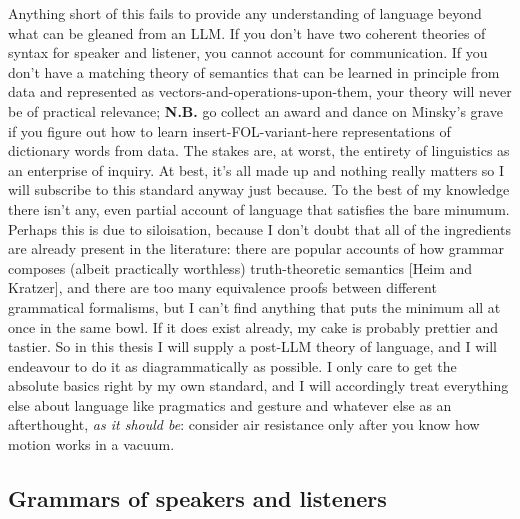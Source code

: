  Anything short of this fails to provide any understanding of language beyond what can be gleaned from an LLM. If you don't have two coherent theories of syntax for speaker and listener, you cannot account for communication. If you don't have a matching theory of semantics that can be learned in principle from data and represented as vectors-and-operations-upon-them, your theory will never be of practical relevance; \textbf{N.B.} go collect an award and dance on Minsky's grave if you figure out how to learn insert-FOL-variant-here representations of dictionary words from data. The stakes are, at worst, the entirety of linguistics as an enterprise of inquiry. At best, it's all made up and nothing really matters so I will subscribe to this standard anyway just because. To the best of my knowledge there isn't any, even partial account of language that satisfies the bare minumum. Perhaps this is due to siloisation, because I don't doubt that all of the ingredients are already present in the literature: there are popular accounts of how grammar composes (albeit practically worthless) truth-theoretic semantics [Heim and Kratzer], and there are too many equivalence proofs between different grammatical formalisms, but I can't find anything that puts the minimum all at once in the same bowl. If it does exist already, my cake is probably prettier and tastier. So in this thesis I will supply a post-LLM theory of language, and I will endeavour to do it as diagrammatically as possible. I only care to get the absolute basics right by my own standard, and I will accordingly treat everything else about language like pragmatics and gesture and whatever else as an afterthought, \emph{as it should be}: consider air resistance only after you know how motion works in a vacuum.

\subsection{Grammars of speakers and listeners}

